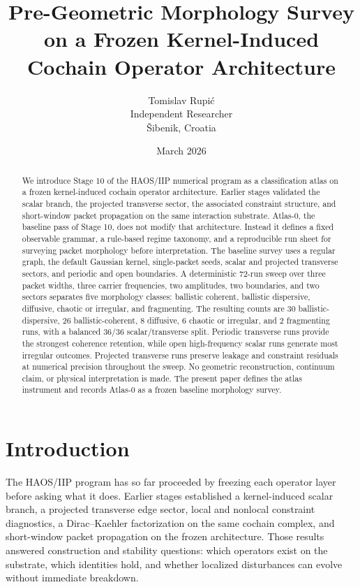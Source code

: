 \documentclass[11pt]{article}
\title{Pre-Geometric Morphology Survey on a Frozen Kernel-Induced Cochain Operator Architecture}
\author{Tomislav Rupi\'c\\Independent Researcher\\\v{S}ibenik, Croatia}
\date{March 2026}
\begin{document}
\maketitle

\begin{abstract}
We introduce Stage 10 of the HAOS/IIP numerical program as a classification atlas on a frozen kernel-induced cochain operator architecture. Earlier stages validated the scalar branch, the projected transverse sector, the associated constraint structure, and short-window packet propagation on the same interaction substrate. Atlas-0, the baseline pass of Stage 10, does not modify that architecture. Instead it defines a fixed observable grammar, a rule-based regime taxonomy, and a reproducible run sheet for surveying packet morphology before interpretation. The baseline survey uses a regular graph, the default Gaussian kernel, single-packet seeds, scalar and projected transverse sectors, and periodic and open boundaries. A deterministic 72-run sweep over three packet widths, three carrier frequencies, two amplitudes, two boundaries, and two sectors separates five morphology classes: ballistic coherent, ballistic dispersive, diffusive, chaotic or irregular, and fragmenting. The resulting counts are 30 ballistic-dispersive, 26 ballistic-coherent, 8 diffusive, 6 chaotic or irregular, and 2 fragmenting runs, with a balanced 36/36 scalar/transverse split. Periodic transverse runs provide the strongest coherence retention, while open high-frequency scalar runs generate most irregular outcomes. Projected transverse runs preserve leakage and constraint residuals at numerical precision throughout the sweep. No geometric reconstruction, continuum claim, or physical interpretation is made. The present paper defines the atlas instrument and records Atlas-0 as a frozen baseline morphology survey.
\end{abstract}

\section{Introduction}
The HAOS/IIP program has so far proceeded by freezing each operator layer before asking what it does. Earlier stages established a kernel-induced scalar branch, a projected transverse edge sector, local and nonlocal constraint diagnostics, a Dirac--Kaehler factorization on the same cochain complex, and short-window packet propagation on the frozen architecture. Those results answered construction and stability questions: which operators exist on the substrate, which identities hold, and whether localized disturbances can evolve without immediate breakdown.
\end{document}
